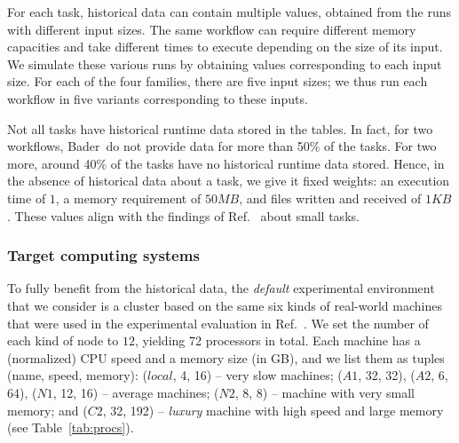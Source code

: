 \documentclass[conference]{IEEEtran}
\newcommand{\skug}[1]{{\color{blue}[SK: #1]}}
\begin{document}
For each task, historical data can contain multiple values, obtained from the runs with different input sizes.
The same workflow can require different memory capacities and take different times to execute
depending on the size of its input.
We simulate these various runs by obtaining values corresponding to each input size.
For each of the four families, there are five input sizes; we thus run each workflow in five variants corresponding to these inputs.

Not all tasks have historical runtime data stored in the tables.
In fact, for two workflows, Bader~\etal do not provide data for more than 50\% of the tasks.
For two more, around 40\% of the tasks have no historical runtime data stored.
Hence, in the absence of historical data about a task, we give it fixed weights:
an execution time of $1$, a memory requirement of $50 MB$, and files written and received of $1KB$.
These values align with the findings of Ref.~\cite{lotaru} about small tasks.
%

\subsubsection{Target computing systems}

To fully benefit from the historical data, the  {\em default} experimental environment
that we consider is a cluster based on the same six
kinds of real-world machines that were used in the experimental evaluation in Ref.~\cite{lotaru}.
We set the number of each kind of node to $12$, yielding 72 processors in total.  %
%
Each machine has a (normalized) CPU speed and a memory size (in GB), and we list them as tuples (name, speed, memory):
($local$, 4, 16) -- very slow machines; ($A1$, 32, 32), ($A2$, 6, 64), ($N1$, 12, 16) -- average machines;
($N2$, 8, 8) -- machine with very small memory; and ($C2$, 32, 192) -- {\em luxury} machine with high speed and
large memory (see Table~\ref{tab:procs}).
\end{document}
